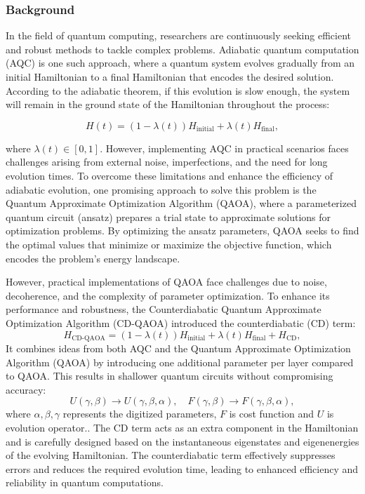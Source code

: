 


\subsubsection{Background}
In the field of quantum computing, researchers are continuously seeking efficient and robust methods to tackle complex problems. Adiabatic quantum computation (AQC) is one such approach, where a quantum system evolves gradually from an initial Hamiltonian to a final Hamiltonian that encodes the desired solution. According to the adiabatic theorem, if this evolution is slow enough, the system will remain in the ground state of the Hamiltonian throughout the process:

\begin{equation}
    H(t) = (1-\lambda(t))H_{\text{initial}} + \lambda(t)H_{\text{final}},
\end{equation}

where $\lambda(t)\in[0,1]$. However, implementing AQC in practical scenarios faces challenges arising from external noise, imperfections, and the need for long evolution times. To overcome these limitations and enhance the efficiency of adiabatic evolution, one promising approach to solve this problem is the Quantum Approximate Optimization Algorithm (QAOA), where a parameterized quantum circuit (ansatz) prepares a trial state to approximate solutions for optimization problems. By optimizing the ansatz parameters, QAOA seeks to find the optimal values that minimize or maximize the objective function, which encodes the problem's energy landscape.

However, practical implementations of QAOA face challenges due to noise, decoherence, and the complexity of parameter optimization. To enhance its performance and robustness, the Counterdiabatic Quantum Approximate Optimization Algorithm (CD-QAOA) introduced the counterdiabatic (CD) term:
\begin{equation}
    H_{\text{CD-QAOA}} = (1 - \lambda(t))H_{\text{initial}} + \lambda(t)H_{\text{final}} + H_{\text{CD}},
\end{equation}
It combines ideas from both AQC and the Quantum Approximate Optimization Algorithm (QAOA) by introducing one additional parameter per layer compared to QAOA. This results in shallower quantum circuits without compromising accuracy:
\begin{equation}
    U(\gamma, \beta)\to U(\gamma, \beta, \alpha), \quad F(\gamma, \beta)\to F(\gamma, \beta, \alpha),
\end{equation}
where $\alpha, \beta, \gamma$ represents the digitized parameters, $F$ is cost function and $U$ is evolution operator..
The CD term acts as an extra component in the Hamiltonian and is carefully designed based on the instantaneous eigenstates and eigenenergies of the evolving Hamiltonian.  The counterdiabatic term effectively suppresses errors and reduces the required evolution time, leading to enhanced efficiency and reliability in quantum computations.

